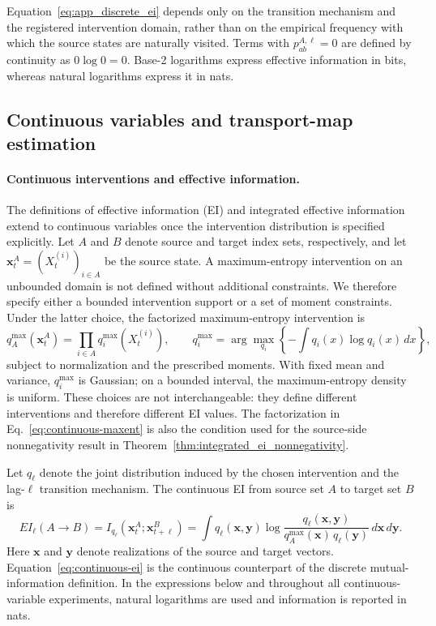 \documentclass[fleqn,10pt]{wlscirep}
\begin{document}
Equation~\eqref{eq:app_discrete_ei} depends only on the transition mechanism
and the registered intervention domain, rather than on the empirical
frequency with which the source states are naturally visited. Terms with
\(p_{ab}^{A,\ell}=0\) are defined by continuity as
\(0\log 0=0\). Base-2 logarithms express effective information in bits,
whereas natural logarithms express it in nats.

\subsection{Continuous variables and transport-map estimation}
\label{app:continuous_estimation}

\paragraph{Continuous interventions and effective information.}
The definitions of effective information (EI) and integrated effective
information extend to continuous variables once the intervention
distribution is specified explicitly.  Let \(A\) and \(B\) denote source and
target index sets, respectively, and let
\(\boldsymbol{x}_{t}^{A}=(X_t^{(i)})_{i\in A}\) be the source state.  A
maximum-entropy intervention on an unbounded domain is not defined without
additional constraints.  We therefore specify either a bounded intervention
support or a set of moment constraints.  Under the latter choice, the
factorized maximum-entropy intervention is
\begin{equation}
q_A^{\max}(\boldsymbol{x}_{t}^{A})
=
\prod_{i\in A}q_i^{\max}\!\left(X_t^{(i)}\right),
\qquad
q_i^{\max}
=
\arg\max_{q_i}
\left\{
-\int q_i(x)\log q_i(x)\,dx
\right\},
\label{eq:continuous-maxent}
\end{equation}
subject to normalization and the prescribed moments.  With fixed mean and
variance, \(q_i^{\max}\) is Gaussian; on a bounded interval, the
maximum-entropy density is uniform.  These choices are not interchangeable:
they define different interventions and therefore different EI values.  The
factorization in Eq.~\eqref{eq:continuous-maxent} is also the condition used
for the source-side nonnegativity result in
Theorem~\ref{thm:integrated_ei_nonnegativity}.

Let \(q_\ell\) denote the joint distribution induced by the chosen
intervention and the lag-\(\ell\) transition mechanism.  The continuous EI
from source set \(A\) to target set \(B\) is
\begin{equation}
EI_\ell(A\!\to\!B)
=
I_{q_\ell}
\!\left(
\boldsymbol{x}_{t}^{A};
\boldsymbol{x}_{t+\ell}^{B}
\right)
=
\int
q_\ell(\boldsymbol{x},\boldsymbol{y})
\log
\frac{
q_\ell(\boldsymbol{x},\boldsymbol{y})
}{
q_A^{\max}(\boldsymbol{x})\,
q_\ell(\boldsymbol{y})
}
\,d\boldsymbol{x}\,d\boldsymbol{y}.
\label{eq:continuous-ei}
\end{equation}
Here \(\boldsymbol{x}\) and \(\boldsymbol{y}\) denote realizations of the
source and target vectors.  Equation~\eqref{eq:continuous-ei} is the
continuous counterpart of the discrete mutual-information definition. In the expressions below and throughout all continuous-variable experiments, natural logarithms are used and information is reported in nats.
\end{document}
